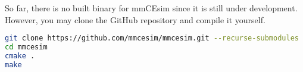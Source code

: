 So far, there is no built binary for mmCEsim since it is still under development.
However, you may clone the GitHub repository and compile it yourself.

\begin{lstlisting}[language=sh, morekeywords={git, cmake, make}, alsoletter={.}]
git clone https://github.com/mmcesim/mmcesim.git --recurse-submodules
cd mmcesim
cmake .
make
\end{lstlisting}
